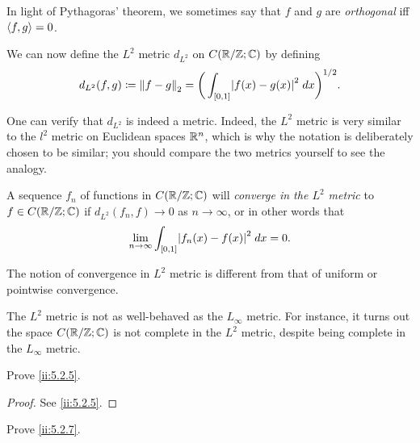 \begin{note}
  In light of Pythagoras' theorem, we sometimes say that \(f\) and \(g\) are \emph{orthogonal} iff \(\inner*{f, g} = 0\).
\end{note}

\begin{ac}\label{ii:ac:5.2.2}
  We can now define the \(L^2\) metric \(d_{L^2}\) on \(C(\R / \Z ; \C)\) by defining
  \[
    d_{L^2}(f, g) \coloneqq \norm*{f - g}_2 = \bigg(\int_{[0, 1]} \abs{f(x) - g(x)}^2 \; dx\bigg)^{1 / 2}.
  \]
\end{ac}

\begin{rmk}\label{ii:5.2.8}
  One can verify that \(d_{L^2}\) is indeed a metric.
  Indeed, the \(L^2\) metric is very similar to the \(l^2\) metric on Euclidean spaces \(\R^n\), which is why the notation is deliberately chosen to be similar;
  you should compare the two metrics yourself to see the analogy.
\end{rmk}

\begin{note}
  A sequence \(f_n\) of functions in \(C(\R / \Z ; \C)\) will \emph{converge in the \(L^2\) metric} to \(f \in C(\R / \Z ; \C)\) if \(d_{L^2}(f_n, f) \to 0\) as \(n \to \infty\), or in other words that
  \[
    \lim_{n \to \infty} \int_{[0, 1]} \abs{f_n(x) - f(x)}^2 \; dx = 0.
  \]
\end{note}

\begin{rmk}\label{ii:5.2.9}
  The notion of convergence in \(L^2\) metric is different from that of uniform or pointwise convergence.
\end{rmk}

\begin{rmk}\label{ii:5.2.10}
  The \(L^2\) metric is not as well-behaved as the \(L_\infty\) metric.
  For instance, it turns out the space \(C(\R / \Z ; \C)\) is not complete in the \(L^2\) metric, despite being complete in the \(L_\infty\) metric.
\end{rmk}

\exercisesection

\begin{ex}\label{ii:ex:5.2.1}
  Prove \cref{ii:5.2.5}.
\end{ex}

\begin{proof}
  See \cref{ii:5.2.5}.
\end{proof}

\begin{ex}\label{ii:ex:5.2.2}
  Prove \cref{ii:5.2.7}.
\end{ex}

